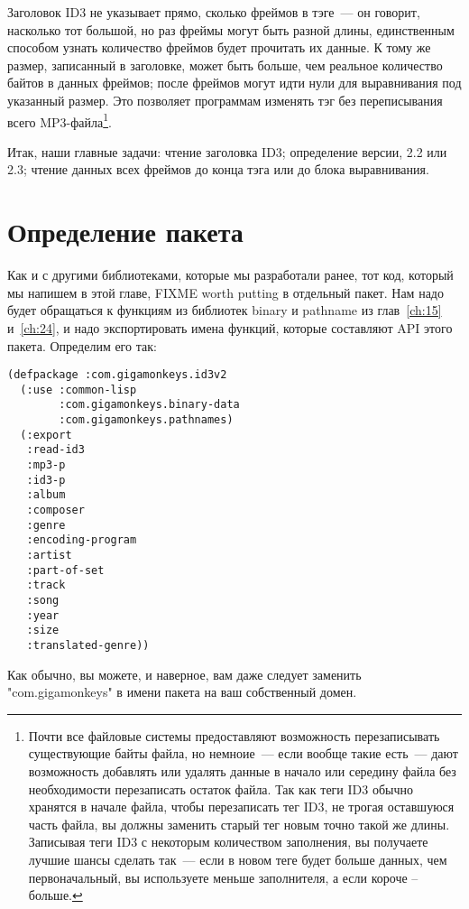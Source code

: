 Заголовок ID3 не указывает прямо, сколько фреймов в тэге~--- он говорит, насколько тот
большой, но раз фреймы могут быть разной длины, единственным способом узнать количество
фреймов будет прочитать их данные.  К тому же размер, записанный в заголовке, может быть
больше, чем реальное количество байтов в данных фреймов; после фреймов могут идти нули для
выравнивания под указанный размер.  Это позволяет программам изменять тэг без
переписывания всего MP3-файла\footnote{Почти все файловые системы предоставляют
  возможность перезаписывать существующие байты файла, но немноие~--- если вообще такие
  есть~--- дают возможность добавлять или удалять данные в начало или середину файла без
  необходимости перезаписать остаток файла. Так как теги ID3 обычно хранятся в начале
  файла, чтобы перезаписать тег ID3, не трогая оставшуюся часть файла, вы должны заменить
  старый тег новым точно такой же длины. Записывая теги ID3 с некоторым количеством
  заполнения, вы получаете лучшие шансы сделать так~--- если в новом теге будет больше
  данных, чем первоначальный, вы используете меньше заполнителя, а если короче --
  больше.}.

Итак, наши главные задачи: чтение заголовка ID3; определение версии, 2.2 или 2.3; чтение
данных всех фреймов до конца тэга или до блока выравнивания.

\section{Определение пакета}

Как и с другими библиотеками, которые мы разработали ранее, тот код, который мы напишем в
этой главе, FIXME worth putting в отдельный пакет.  Нам надо будет обращаться к функциям
из библиотек binary и pathname из глав~\ref{ch:15} и~\ref{ch:24}, и надо экспортировать
имена функций, которые составляют API этого пакета.  Определим его так:

\begin{lstlisting}
(defpackage :com.gigamonkeys.id3v2
  (:use :common-lisp
        :com.gigamonkeys.binary-data
        :com.gigamonkeys.pathnames)
  (:export
   :read-id3
   :mp3-p
   :id3-p
   :album
   :composer
   :genre
   :encoding-program
   :artist
   :part-of-set
   :track
   :song
   :year
   :size
   :translated-genre))
\end{lstlisting}

Как обычно, вы можете, и наверное, вам даже следует заменить "com.gigamonkeys" в имени
пакета на ваш собственный домен.

